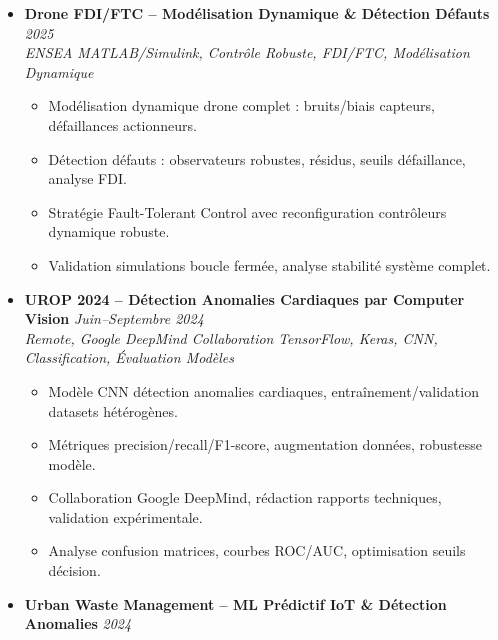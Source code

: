 \documentclass[a4paper,11pt]{article}
\begin{document}
\begin{itemize}[leftmargin=*, label={-}]
    \vspace{3pt}
    \item \textbf{Drone FDI/FTC -- Modélisation Dynamique \& D\'etection D\'efauts} \hfill \textit{2025} \\
    \textit{ENSEA} \hfill \textit{MATLAB/Simulink, Contr\^ole Robuste, FDI/FTC, Modélisation Dynamique}
    \vspace{-2pt}
        \begin{itemize}[leftmargin=0.4cm, nosep, label=\tiny$\bullet$]
            \item \small{Modélisation dynamique drone complet : bruits/biais capteurs, défaillances actionneurs.}
            \item \small{Détection défauts : observateurs robustes, résidus, seuils défaillance, analyse FDI.}
            \item \small{Stratégie Fault-Tolerant Control avec reconfiguration contrôleurs dynamique robuste.}
            \item \small{Validation simulations boucle fermée, analyse stabilité système complet.}
        \end{itemize}
    \vspace{3pt}
    \item \textbf{UROP 2024 -- D\'etection Anomalies Cardiaques par Computer Vision} \hfill \textit{Juin--Septembre 2024} \\
    \textit{Remote, Google DeepMind Collaboration} \hfill \textit{TensorFlow, Keras, CNN, Classification, Évaluation Modèles}
    \vspace{-2pt}
        \begin{itemize}[leftmargin=0.4cm, nosep, label=\tiny$\bullet$]
            \item \small{Modèle CNN détection anomalies cardiaques, entraînement/validation datasets hétérogènes.}
            \item \small{Métriques precision/recall/F1-score, augmentation données, robustesse modèle.}
            \item \small{Collaboration Google DeepMind, rédaction rapports techniques, validation expérimentale.}
            \item \small{Analyse confusion matrices, courbes ROC/AUC, optimisation seuils décision.}
        \end{itemize}
    \vspace{3pt}
    \item \textbf{Urban Waste Management -- ML Pr\'edictif IoT \& D\'etection Anomalies} \hfill \textit{2024} \\

\end{itemize}
\end{document}
